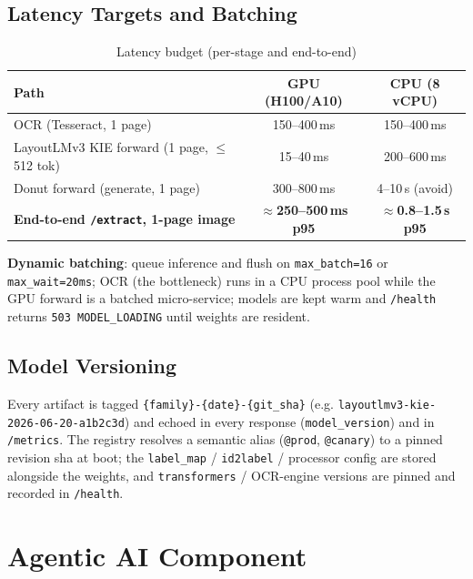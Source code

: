 \documentclass[12pt,a4paper]{article}
\begin{document}
\subsection{Latency Targets and Batching}

\begin{table}[H]
\centering
\caption{Latency budget (per-stage and end-to-end)}
\begin{tabular}{lcc}
\toprule
\textbf{Path} & \textbf{GPU (H100/A10)} & \textbf{CPU (8 vCPU)} \\
\midrule
OCR (Tesseract, 1 page)                 & 150--400\,ms  & 150--400\,ms \\
LayoutLMv3 KIE forward (1 page, $\leq$512 tok) & 15--40\,ms & 200--600\,ms \\
Donut forward (generate, 1 page)        & 300--800\,ms  & 4--10\,s (avoid) \\
\textbf{End-to-end \texttt{/extract}, 1-page image} & \textbf{$\approx$250--500\,ms p95} & \textbf{$\approx$0.8--1.5\,s p95} \\
\bottomrule
\end{tabular}
\end{table}

\textbf{Dynamic batching}: queue inference and flush on \texttt{max\_batch=16} or
\texttt{max\_wait=20ms}; OCR (the bottleneck) runs in a CPU process pool while the GPU
forward is a batched micro-service; models are kept warm and \texttt{/health} returns
\texttt{503 MODEL\_LOADING} until weights are resident.

\subsection{Model Versioning}

Every artifact is tagged \texttt{\{family\}-\{date\}-\{git\_sha\}} (e.g.
\texttt{layoutlmv3-kie-2026-06-20-a1b2c3d}) and echoed in every response
(\texttt{model\_version}) and in \texttt{/metrics}. The registry resolves a semantic
alias (\texttt{@prod}, \texttt{@canary}) to a pinned revision sha at boot; the
\texttt{label\_map} / \texttt{id2label} / processor config are stored alongside the
weights, and \texttt{transformers} / OCR-engine versions are pinned and recorded in
\texttt{/health}.

\section{Agentic AI Component}
\end{document}
